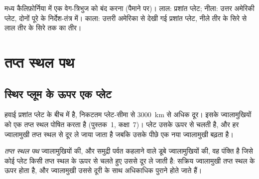 \begin{omfigure}

{\small मध्य कैलिफ़ोर्निया में एक वेग-त्रिभुज को बंद करना (पैमाने पर)। लाल:
प्रशांत प्लेट; नीला: उत्तर अमेरिकी प्लेट, दोनों पूरे
 के निर्देश-तंत्र में। काला: उत्तरी अमेरिका से देखी गई प्रशांत प्लेट,
नीले तीर के सिरे से लाल तीर के सिरे तक का तीर।}
\end{omfigure}

\section{तप्त स्थल पथ}

\subsection{स्थिर प्लूम के ऊपर एक प्लेट}

हवाई प्रशांत प्लेट के बीच में है, निकटतम प्लेट-सीमा से
\qty{3000}{km} से अधिक दूर।
 इसके ज्वालामुखियों को एक तप्त स्थल पोषित करता है (पुस्तक~1,
कक्षा~7)। प्लेट उसके ऊपर से चलती है, और हर ज्वालामुखी
तप्त स्थल से दूर ले जाया जाता है जबकि उसके पीछे एक नया ज्वालामुखी बढ़ता है।

\begin{definition}[तप्त स्थल पथ]\label{def:g11:plate-motions:hotspot-track}
\emph{तप्त स्थल पथ} ज्वालामुखियों की, और
समुद्री पर्वत कहलाने वाले डूबे ज्वालामुखियों की, वह पंक्ति है जिसे कोई प्लेट
किसी तप्त स्थल के ऊपर से चलते हुए उससे दूर ले जाती है: सक्रिय ज्वालामुखी तप्त स्थल के ऊपर होता है, और
ज्वालामुखी उससे दूरी के साथ अधिकाधिक पुराने होते जाते हैं।
\end{definition}


